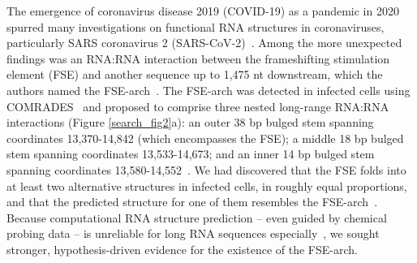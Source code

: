 \documentclass[main.tex]{subfiles}
\begin{document}
The emergence of coronavirus disease 2019 (COVID-19) as a pandemic in 2020 spurred many investigations on functional RNA structures in coronaviruses, particularly SARS coronavirus 2 (SARS-CoV-2)~\cite{Rangan2020,Manfredonia2020,Ziv2020,LSun2021,YanZhang2021,Huston2021,Rangan2021,Morandi2021,Yang2021,Lan2022}. Among the more unexpected findings was an RNA:RNA interaction between the frameshifting stimulation element (FSE) and another sequence up to 1,475 nt downstream, which the authors named the FSE-arch~\cite{Ziv2020}. The FSE-arch was detected in infected cells using COMRADES~\cite{Ziv2018} and proposed to comprise three nested long-range RNA:RNA interactions (Figure \ref{search_fig2}a): an outer 38 bp bulged stem spanning coordinates 13,370-14,842 (which encompasses the FSE); a middle 18 bp bulged stem spanning coordinates 13,533-14,673; and an inner 14 bp bulged stem spanning coordinates 13,580-14,552~\cite{Ziv2020}. We had discovered that the FSE folds into at least two alternative structures in infected cells, in roughly equal proportions, and that the predicted structure for one of them resembles the FSE-arch~\cite{Lan2022}. Because computational RNA structure prediction -- even guided by chemical probing data -- is unreliable for long RNA sequences especially~\cite{Aviran2022}, we sought stronger, hypothesis-driven evidence for the existence of the FSE-arch.
\end{document}
